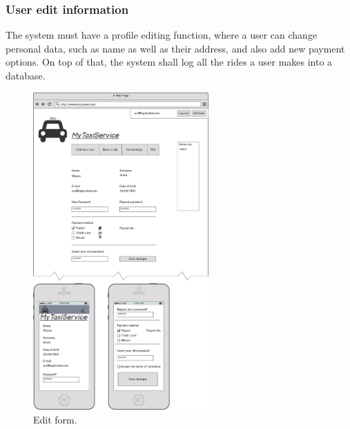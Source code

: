 		\subsubsection {User edit information}
			The system must have a profile editing function, where a user can change personal data, such as name as well as their address,
			and also add new payment options. On top of that, the system shall log all the rides a user makes into a database.
			\begin{figure}[h!]
				\includegraphics[width=0.6\textwidth]{mockup/edituser.png}
				\caption{Edit form.}
			\end{figure}
			\newpage
